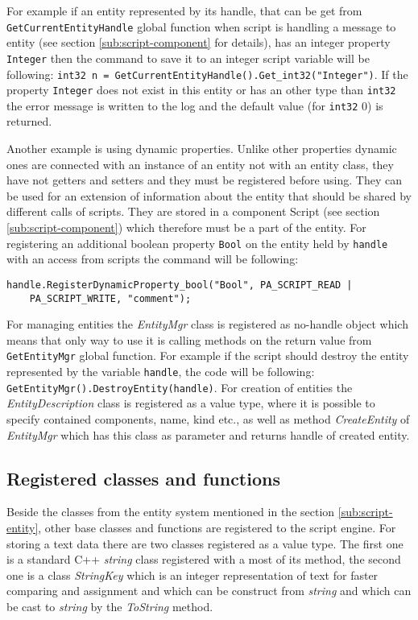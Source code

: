 For example if an entity represented by its handle, that can be get from \verb/GetCurrentEntityHandle/ global function when script is handling a message to entity (see section \ref{sub:script-component} for details), has an integer property \verb/Integer/ then the command to save it to an integer script variable will be following: \verb/int32 n = GetCurrentEntityHandle().Get_int32("Integer")/. If the property \verb/Integer/ does not exist in this entity or has an other type than \verb/int32/ the error message is written to the log and the default value (for \verb/int32/ 0) is returned.

Another example is using dynamic properties. Unlike other properties dynamic ones are connected with an instance of an entity not with an entity class, they have not getters and setters and they must be registered before using. They can be used for an extension of information about the entity that should be shared by different calls of scripts. They are stored in a component Script (see section \ref{sub:script-component}) which therefore must be a part of the entity. For registering an additional boolean property \verb/Bool/ on the entity held by \verb/handle/ with an access from scripts the command will be following:
\begin{verbatim}
handle.RegisterDynamicProperty_bool("Bool", PA_SCRIPT_READ |
    PA_SCRIPT_WRITE, "comment");
\end{verbatim}

For managing entities the \emph{EntityMgr} class is registered as no-handle object which means that only way to use it is calling methods on the return value from \verb/GetEntityMgr/ global function. For example if the script should destroy the entity represented by the variable \verb/handle/, the code will be following: \verb/GetEntityMgr().DestroyEntity(handle)/. For creation of entities the \emph{EntityDescription} class is registered as a value type, where it is possible to specify contained components, name, kind etc., as well as method \emph{CreateEntity} of \emph{EntityMgr} which has this class as parameter and returns handle of created entity.

\subsection{Registered classes and functions}
\label{sub:script-registered}

Beside the classes from the entity system mentioned in the section \ref{sub:script-entity}, other base classes and functions are registered to the script engine. For storing a text data there are two classes registered as a value type. The first one is a standard C++ \emph{string} class registered with a most of its method, the second one is a class \emph{StringKey} which is an integer representation of text for faster comparing and assignment and which can be construct from \emph{string} and which can be cast to \emph{string} by the \emph{ToString} method.

